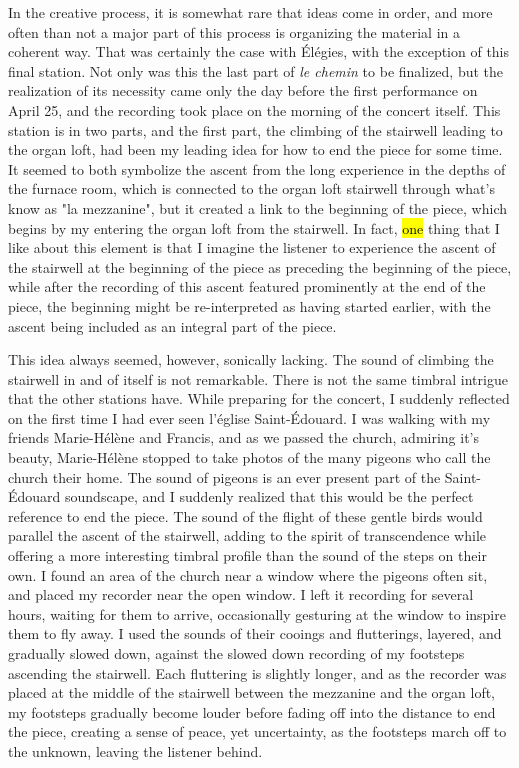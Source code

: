 \documentclass[12pt,twoside,maitrise]{dms_ks}
\theoremstyle{definition}
\begin{document}
{In the creative process, it is somewhat rare that ideas come in order, and more often than not a major part of this process is organizing the material in a coherent way. 
That was certainly the case with Élégies, with the exception of this final station. 
Not only was this the last part of \textit{le chemin} to be finalized, but the realization of its necessity came only the day before the first performance on April 25, and the recording took place on the morning of the concert itself. 
This station is in two parts, and the first part, the climbing of the stairwell leading to the organ loft, had been my leading idea for how to end the piece for some time. 
It seemed to both symbolize the ascent from the long experience in the depths of the furnace room, which is connected to the organ loft stairwell through what's know as "la mezzanine", but it created a link to the beginning of the piece, which begins by my entering the organ loft from the stairwell. 
In fact, \hl{one} thing that I like about this element is that I imagine the listener to experience the ascent of the stairwell at the beginning of the piece as preceding the beginning of the piece, while after the recording of this ascent featured prominently at the end of the piece, the beginning might be re-interpreted as having started earlier, with the ascent being included as an integral part of the piece.

This idea always seemed, however, sonically lacking. 
The sound of climbing the stairwell in and of itself is not remarkable. 
There is not the same timbral intrigue that the other stations have. 
While preparing for the concert, I suddenly reflected on the first time I had ever seen l'église Saint-Édouard. 
I was walking with my friends Marie-Hélène and Francis, and as we passed the church, admiring it's beauty, Marie-Hélène stopped to take photos of the many pigeons who call the church their home. 
The sound of pigeons is an ever present part of the Saint-Édouard soundscape, and I suddenly realized that this would be the perfect reference to end the piece. 
The sound of the flight of these gentle birds would parallel the ascent of the stairwell, adding to the spirit of transcendence while offering a more interesting timbral profile than the sound of the steps on their own. 
I found an area of the church near a window where the pigeons often sit, and placed my recorder near the open window. 
I left it recording for several hours, waiting for them to arrive, occasionally gesturing at the window to inspire them to fly away. 
I used the sounds of their cooings and flutterings, layered, and gradually slowed down, against the slowed down recording of my footsteps ascending the stairwell. 
Each fluttering is slightly longer, and as the recorder was placed at the middle of the stairwell between the mezzanine and the organ loft, my footsteps gradually become louder before fading off into the distance to end the piece, creating a sense of peace, yet uncertainty, as the footsteps march off to the unknown, leaving the listener behind.

}
\end{document}
